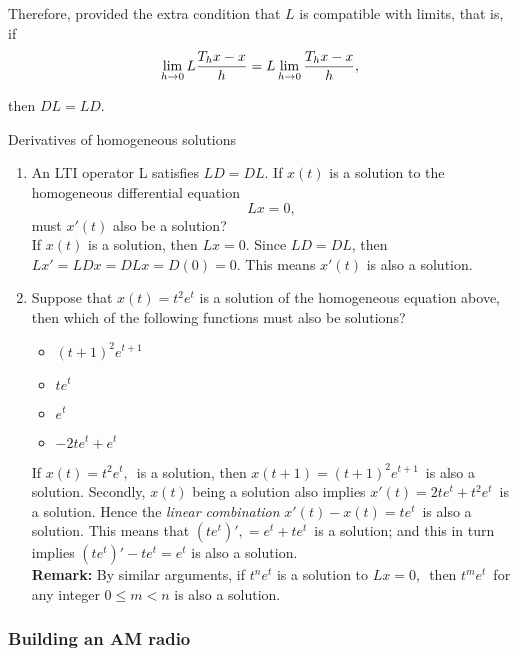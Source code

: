 Therefore, provided the extra condition that $L$ is compatible with limits,
that is, if
\begin{equation*}
  \displaystyle  \displaystyle \lim _{h\to 0} L \frac{T_ h x-x}{h}
  \displaystyle =
  \displaystyle L \lim _{h\to 0} \frac{T_ h x-x}{h},
\end{equation*}

then $DL = LD$.

\begin{homework}
  Derivatives of homogeneous solutions
\end{homework}

\begin{enumerate}
\item An LTI operator L satisfies $LD=DL$.
  If $x(t)$ is a solution to the homogeneous differential equation
  \begin{equation*}
    L x = 0,
  \end{equation*}
  must $x′(t)$ also be a solution?\\

  If $x(t)$ is a solution,
  then $Lx=0$. Since $LD=DL$, then $Lx′=LDx=DLx=D(0)=0$. 
  This means $x′(t)$ is also a solution.
\item Suppose that $x(t)=t^2e^t$ is a solution of the homogeneous equation above,
  then which of the following functions must also be solutions?
  \begin{itemize}
  \item $(t+1)^2 e^{t+1}$
  \item $te^t$
  \item $e^t$
  \item $-2te^t + e^t$
  \end{itemize}

  If $x(t)=t^2e^{t},\,$ is a solution,
  then $x(t+1)=(t+1)^2 e^{t+1}\,$ is also a solution.
  Secondly, $x(t)$ being a solution also implies $x′(t) = 2te^t + t^2e^t\,$ is a solution.
  Hence the \emph{linear combination} $x′(t) − x(t) =te^t\,$ is also a solution.
  This means that $(te^t)′,= e^t+te^t\,$ is a solution;
  and this in turn implies $(te^t)′− te^t=e^t$ is also a solution.\\

  \textbf{Remark:} By similar arguments, if $t^n e^t$
  is a solution to $Lx=0,\,$ then $t^me^t\,$ for any integer $0\leq m<n$ is also a solution.

\end{enumerate}

\clearpage
\subsubsection{Building an AM radio}

